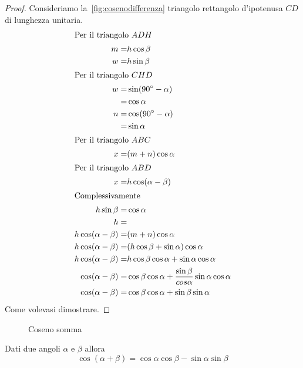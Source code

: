 \begin{proof}
	Consideriamo la~\vref{fig:cosenodifferenza} triangolo rettangolo d'ipotenusa $CD$ di lunghezza unitaria. 
	\begin{align*}
	\intertext{Per il triangolo $ADH$}
	m=&h\cos\beta\\
	w=&h\sin\beta\\
	\intertext{Per il triangolo $CHD$}
	w=&\sin(90^{\circ}-\alpha)\\
	=&\cos\alpha\\
	n=&\cos(90^{\circ}-\alpha)\\
	=&\sin\alpha\\
	\intertext{Per il triangolo $ABC$}
	x=&(m+n)\cos\alpha\\
	\intertext{Per il triangolo $ABD$}
	x=&h\cos(\alpha-\beta)\\
	\intertext{Complessivamente}
	h\sin\beta=&\cos\alpha\\
	h=&\\
	h\cos(\alpha-\beta)=&(m+n)\cos\alpha\\
	h\cos(\alpha-\beta)=&(h\cos\beta+\sin\alpha)\cos\alpha\\
	h\cos(\alpha-\beta)=&h\cos\beta\cos\alpha+\sin\alpha\cos\alpha\\
	\cos(\alpha-\beta)=&\cos\beta\cos\alpha+\dfrac{\sin\beta}{cos\alpha}\sin\alpha\cos\alpha\\
	\cos(\alpha-\beta)=&\cos\beta\cos\alpha+\sin\beta\sin\alpha\\
	\end{align*}
	Come volevasi dimostrare.
\end{proof}
\begin{figure}
	\centering
	
	\caption[Coseno somma]{Coseno somma}
	\label{fig:cosenosomma}
\end{figure}
\begin{thm}\label{thm:cosenosomma}
	Dati due angoli $\alpha$ e $\beta$ allora
	\[\cos(\alpha+\beta)=\cos\alpha\cos\beta-\sin\alpha\sin\beta  \]	
\end{thm}~\cite{Smiley1999}
